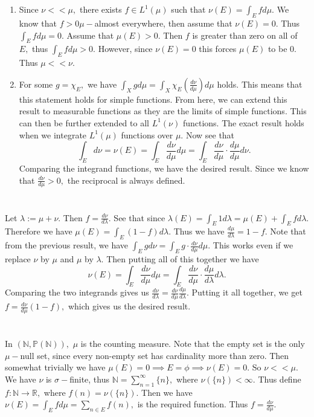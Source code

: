 \documentclass{article}
\begin{document}
\section{} %
\begin{enumerate}
	\item Since $\nu << \mu,$ there exists $f \in L^1(\mu)$ such that $\nu(E)=\int_E f d\mu.$ We know that $f>0 \mu-$almost everywhere, then assume that 
	$\nu(E)=0.$ Thus $\int_{E}f d\mu=0.$ Assume that $\mu(E)>0.$ Then $f$ is greater than zero on all of $E,$ thus $\int_E f d\mu > 0.$ However, since 
	$\nu(E)=0$ this forces $\mu(E)$ to be $0.$ Thus $\mu << \nu.$
	
	\item For some $g=\chi_E,$ we have $\int_X g d\mu= \int_X \chi_E \left(\frac{d\nu}{d\mu}\right) d\mu$ holds. This means that this statement holds for 
	simple functions. From here, we can extend this result to measurable functions as they are the limits of simple functions. This can then be further 
	extended to all $L^1(\nu)$ functions. The exact result holds when we integrate $L^1(\mu)$ functions over $\mu.$ Now see that 
	$$\int_{E}d\nu=\nu(E)=\int_{E}\frac{d\nu}{d\mu} d\mu=\int_{E} \frac{d\nu}{d\mu}\cdot \frac{d\mu}{d\mu}d\nu.$$ Comparing the integrand functions, we have 
	the desired result. Since we know that $\frac{d\nu}{d\mu}>0,$ the reciprocal is always defined.  
\end{enumerate}
\section{} %
Let $\lambda:= \mu + \nu.$ Then $f=\frac{d\nu}{d\lambda}.$ See that since $\lambda(E)=\int_{E}1 d\lambda= \mu(E)+ \int_{E} f d\lambda.$ Therefore we have 
$\mu(E)=\int_{E}(1-f)d\lambda.$ Thus we have $\frac{d\mu}{d\lambda}=1-f.$ Note that from the previous result, we have $\int_{E}g d\nu= \int_{E}g \cdot 
\frac{d\nu}{d\mu} d\mu.$ This works even if we replace $\nu$ by $\mu$  and $\mu$ by $\lambda.$ Then putting all of this together we have $$\nu(E)=\int_{E} 
\frac{d\nu}{d\mu} d\mu= \int_{E}\frac{d\nu}{d\mu}\cdot \frac{d\mu}{d\lambda} d\lambda.$$ Comparing the two integrands gives us 
$\frac{d\nu}{d\lambda}=\frac{d\nu}{d\mu}\frac{d\mu}{d\lambda}.$ Putting it all together, we get $f=\frac{d\nu}{d\mu}(1-f),$ which gives us the desired 
result.
\section{} %
In $(\mathbb{N},\mathbb{P(N)}),$ $\mu$ is the counting measure. Note that the empty set is the only $\mu-$null set, since every non-empty set has 
cardinality more than zero. Then somewhat trivially we have $\mu(E)=0 \implies E=\phi \implies \nu(E)=0.$ So $\nu << \mu.$ We have $\nu$ is $\sigma-$finite, 
thus $\mathbb{N}=\sum_{n=1}^{\infty}\{n\},$ where $\nu(\{n\})<\infty.$ Thus define $f: \mathbb{N} \rightarrow \mathbb{R},$ where $f(n)=\nu(\{n\}).$ Then we 
have $\nu(E)=\int_E f d\mu=\sum_{n \in E}f(n),$ is the required function. Thus $f=\frac{d\nu}{d\mu}.$
\end{document}

